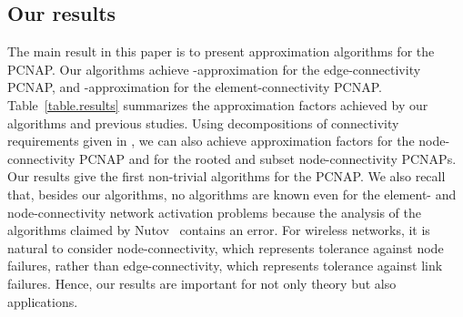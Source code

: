\documentclass[11pt]{article}
\begin{document}
\subsection{Our results}

The main result in this paper is to present approximation algorithms for
the PCNAP.
Our algorithms achieve -approximation for the
edge-connectivity PCNAP, and
-approximation for the element-connectivity PCNAP.
Table~\ref{table.results} summarizes the approximation factors achieved by our algorithms
and previous studies.
Using decompositions of connectivity requirements given in 
\cite{ChuzhoyK12,Nutov12uncrossable,Nutov12subset},
we can also achieve approximation factors
 for the node-connectivity PCNAP
and  for the rooted and
subset node-connectivity PCNAPs.
Our results 
give the first non-trivial algorithms for the PCNAP.
We also recall that, 
besides our algorithms,
no algorithms are known
even for the element- and node-connectivity network activation problems
because the analysis of the algorithms claimed 
by Nutov~\cite{Nutov12uncrossable,Nutov13activation}
contains an error.
For wireless networks, it is natural to consider node-connectivity, 
which represents tolerance against node failures,
rather than edge-connectivity, which represents tolerance against link
failures.
Hence, our results are important for not only theory but also applications.
\end{document}

